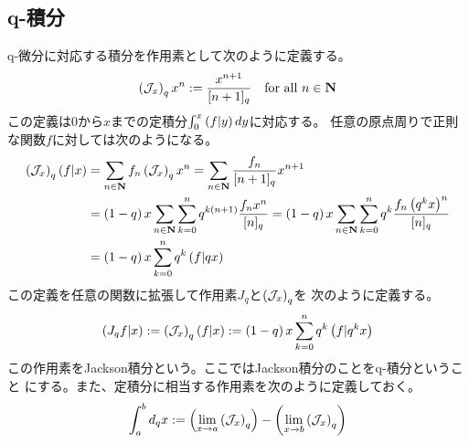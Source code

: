 {\subsection{q-積分}\label{s2:q-積分} %
	q-微分に対応する積分を作用素として次のように定義する。
	\begin{equation*}\begin{split}
		\plr{\J_x}_q x^n := \frac{x^{n+1}}{[n+1]_q} \quad\text{for all } n\in\sizen
	\end{split}\end{equation*}
	この定義は$0$から$x$までの定積分$\int_0^x\plr{f|y}dy$に対応する。
	任意の原点周りで正則な関数$f$に対しては次のようになる。
	\begin{equation*}\begin{split}
		\plr{\J_x}_q \plr{f|x} &= \sum_{n\in\sizen} f_n \plr{\J_x}_q x^n
		= \sum_{n\in\sizen} \frac{f_n}{[n+1]_q} x^{n+1} \\
		&= \plr{1 - q}x \sum_{n\in\sizen}\sum_{k=0}^n q^{k\plr{n+1}}
			\frac{f_nx^n}{[n]_q}
		= \plr{1 - q}x \sum_{n\in\sizen}\sum_{k=0}^n q^k\frac{f_n\plr{q^kx}^n}{[n]_q} \\
		&= \plr{1 - q}x \sum_{k=0}^n q^k\plr{f|qx}
	\end{split}\end{equation*}
	この定義を任意の関数に拡張して作用素$J_q$と$\plr{\J_x}_q$を
	次のように定義する。
	\begin{equation*}\begin{split}
		\plr{J_qf|x} := \plr{\J_x}_q \plr{f|x} 
		:= \plr{1 - q}x \sum_{k=0}^n q^k\plr{f|q^kx}
	\end{split}\end{equation*}
	この作用素をJackson積分という。ここではJackson積分のことをq-積分ということ
	にする。また、定積分に相当する作用素を次のように定義しておく。
	\begin{equation*}\begin{split}
		\int_a^bd_qx := \plr{\lim_{x\to a}\plr{\J_x}_q}
			- \plr{\lim_{x\to b}\plr{\J_x}_q}
	\end{split}\end{equation*}

}
